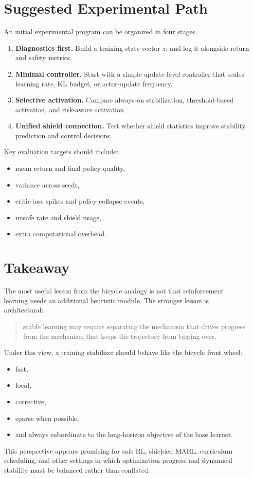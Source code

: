 \documentclass[11pt]{article}
\begin{document}
\section{Suggested Experimental Path}

An initial experimental program can be organized in four stages.

\begin{enumerate}[leftmargin=1.5em]
    \item \textbf{Diagnostics first.} Build a training-state vector $z_t$ and log it alongside return and safety metrics.
    \item \textbf{Minimal controller.} Start with a simple update-level controller that scales learning rate, KL budget, or actor-update frequency.
    \item \textbf{Selective activation.} Compare always-on stabilization, threshold-based activation, and risk-aware activation.
    \item \textbf{Unified shield connection.} Test whether shield statistics improve stability prediction and control decisions.
\end{enumerate}

Key evaluation targets should include:
\begin{itemize}[leftmargin=1.5em]
    \item mean return and final policy quality,
    \item variance across seeds,
    \item critic-loss spikes and policy-collapse events,
    \item unsafe rate and shield usage,
    \item extra computational overhead.
\end{itemize}

\section{Takeaway}

The most useful lesson from the bicycle analogy is not that reinforcement learning needs an additional heuristic module. The stronger lesson is architectural:
\begin{quote}
stable learning may require separating the mechanism that drives progress from the mechanism that keeps the trajectory from tipping over.
\end{quote}

Under this view, a training stabilizer should behave like the bicycle front wheel:
\begin{itemize}[leftmargin=1.5em]
    \item fast,
    \item local,
    \item corrective,
    \item sparse when possible,
    \item and always subordinate to the long-horizon objective of the base learner.
\end{itemize}

This perspective appears promising for safe RL, shielded MARL, curriculum scheduling, and other settings in which optimization progress and dynamical stability must be balanced rather than conflated.
\end{document}
